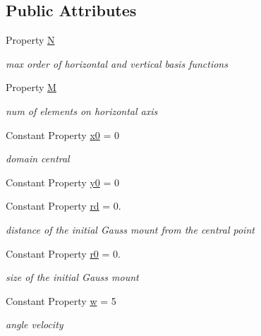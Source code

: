\subsection*{Public Attributes}
\begin{DoxyCompactItemize}
\item 
Property \hyperlink{class_adv_rotation_uniform_mesh3d_af59bece2b04f2084c05452a1e55cdd51}{N}
\begin{DoxyCompactList}\small\item\em max order of horizontal and vertical basis functions \end{DoxyCompactList}\item 
Property \hyperlink{class_adv_rotation_uniform_mesh3d_a6d00f1706f91651bf193d8a7cb60b643}{M}
\begin{DoxyCompactList}\small\item\em num of elements on horizontal axis \end{DoxyCompactList}\item 
Constant Property \hyperlink{class_adv_rotation_uniform_mesh3d_ae319c96312f86a261f44e9bd0a225dd6}{x0} = 0
\begin{DoxyCompactList}\small\item\em domain central \end{DoxyCompactList}\item 
Constant Property \hyperlink{class_adv_rotation_uniform_mesh3d_ad6dcc51336f2a4b365d65e44b6180c93}{y0} = 0
\item 
Constant Property \hyperlink{class_adv_rotation_uniform_mesh3d_a671a8cd355159cced41a25a77cda5191}{rd} = 0.
\begin{DoxyCompactList}\small\item\em distance of the initial Gauss mount from the central point \end{DoxyCompactList}\item 
Constant Property \hyperlink{class_adv_rotation_uniform_mesh3d_a9b2e02d8edba321cd276621c949b883d}{r0} = 0.
\begin{DoxyCompactList}\small\item\em size of the initial Gauss mount \end{DoxyCompactList}\item 
Constant Property \hyperlink{class_adv_rotation_uniform_mesh3d_a78021752187fa4d2b67133afffbdbef6}{w} = 5
\begin{DoxyCompactList}\small\item\em angle velocity \end{DoxyCompactList}\end{DoxyCompactItemize}
